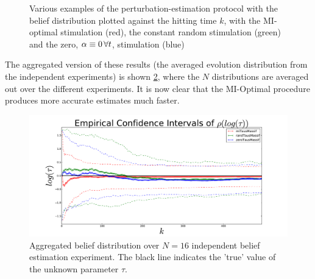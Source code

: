 \documentclass{article}
\begin{document}
\begin{figure}[h]
\begin{center}
{}
\caption[labelInTOC]{Various examples of the perturbation-estimation protocol
with the belief distribution plotted against the hitting time $k$,  with the
MI-optimal stimulation (red), the constant random stimulation (green) and the zero, ${\alpha}\equiv 0\,\forall t$, stimulation (blue)}
\label{fig:online_optimization_more_examples}
\end{center}
\end{figure} 

The aggregated version of these results (the averaged evolution distribution
from the independent experiments) is shown
\cref{fig:online_optimization_aggregated_belief_evolution}, where the $N$
distributions are averaged out over the different experiments. It is now clear 
that the MI-Optimal procedure produces more accurate estimates much faster.
 
\begin{figure}[htp]
\begin{center}
  \includegraphics[width=\textwidth]{Figs/HTOnlineEstimator/aggregated_belief_distn_aggregated_ensemble_distn_evolution.pdf}
  \caption[Aggregated belief distribution vs. experiment hitting time index]{Aggregated belief distribution over $N=16$ independent belief estimation experiment. The black line indicates the 'true' value of the
  unknown parameter $\tau$. } 
  \label{fig:online_optimization_aggregated_belief_evolution}
\end{center}
\end{figure}
\end{document}
